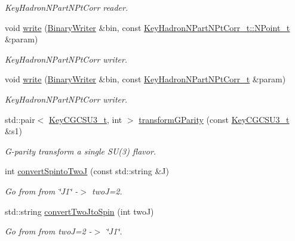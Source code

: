 \begin{DoxyCompactItemize}
\begin{DoxyCompactList}\small\item\em Key\+Hadron\+N\+Part\+N\+Pt\+Corr reader. \end{DoxyCompactList}\item 
void \mbox{\hyperlink{namespaceHadron_aef02c5c2c485a766d9e66d0dabe73f62}{write}} (\mbox{\hyperlink{classADATIO_1_1BinaryWriter}{Binary\+Writer}} \&bin, const \mbox{\hyperlink{structHadron_1_1KeyHadronNPartNPtCorr__t_1_1NPoint__t}{Key\+Hadron\+N\+Part\+N\+Pt\+Corr\+\_\+t\+::\+N\+Point\+\_\+t}} \&param)
\begin{DoxyCompactList}\small\item\em Key\+Hadron\+N\+Part\+N\+Pt\+Corr writer. \end{DoxyCompactList}\item 
void \mbox{\hyperlink{namespaceHadron_adfbaeaa21e67fb5560f0cf7bddc6ce70}{write}} (\mbox{\hyperlink{classADATIO_1_1BinaryWriter}{Binary\+Writer}} \&bin, const \mbox{\hyperlink{structHadron_1_1KeyHadronNPartNPtCorr__t}{Key\+Hadron\+N\+Part\+N\+Pt\+Corr\+\_\+t}} \&param)
\begin{DoxyCompactList}\small\item\em Key\+Hadron\+N\+Part\+N\+Pt\+Corr writer. \end{DoxyCompactList}\item 
std\+::pair$<$ \mbox{\hyperlink{structHadron_1_1KeyCGCSU3__t}{Key\+C\+G\+C\+S\+U3\+\_\+t}}, int $>$ \mbox{\hyperlink{namespaceHadron_ae0f88dc43657f9dd4f118d41608859cc}{transform\+G\+Parity}} (const \mbox{\hyperlink{structHadron_1_1KeyCGCSU3__t}{Key\+C\+G\+C\+S\+U3\+\_\+t}} \&s1)
\begin{DoxyCompactList}\small\item\em G-\/parity transform a single S\+U(3) flavor. \end{DoxyCompactList}\item 
int \mbox{\hyperlink{namespaceHadron_acca1db731e7341c6fce2d78c3442c739}{convert\+Spinto\+TwoJ}} (const std\+::string \&J)
\begin{DoxyCompactList}\small\item\em Go from from \char`\"{}\+J1\char`\"{} -\/$>$ twoJ=2. \end{DoxyCompactList}\item 
std\+::string \mbox{\hyperlink{namespaceHadron_a8593942e8f0063aaf40c4593dbb2cdbe}{convert\+Two\+Jto\+Spin}} (int twoJ)
\begin{DoxyCompactList}\small\item\em Go from from twoJ=2 -\/$>$ \char`\"{}\+J1\char`\"{}. \end{DoxyCompactList}\item 

\end{DoxyCompactItemize}
